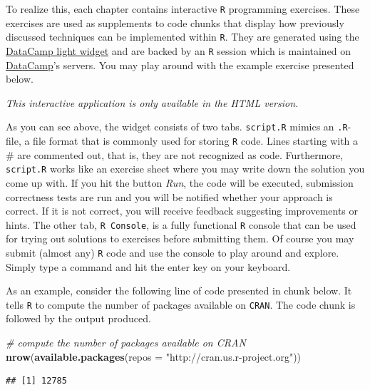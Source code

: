 \documentclass[]{book}
\newenvironment{Shaded}{\begin{snugshade}}{\end{snugshade}}
\newcommand{\KeywordTok}[1]{\textcolor[rgb]{0.13,0.29,0.53}{\textbf{#1}}}
\newcommand{\DataTypeTok}[1]{\textcolor[rgb]{0.13,0.29,0.53}{#1}}
\newcommand{\StringTok}[1]{\textcolor[rgb]{0.31,0.60,0.02}{#1}}
\newcommand{\CommentTok}[1]{\textcolor[rgb]{0.56,0.35,0.01}{\textit{#1}}}
\newcommand{\NormalTok}[1]{#1}
\theoremstyle{definition}
\theoremstyle{definition}
\theoremstyle{definition}
\theoremstyle{remark}
\begin{document}
To realize this, each chapter contains interactive \texttt{R}
programming exercises. These exercises are used as supplements to code
chunks that display how previously discussed techniques can be
implemented within \texttt{R}. They are generated using the
\href{https://github.com/datacamp/datacamp-light}{DataCamp light widget}
and are backed by an \texttt{R} session which is maintained on
\href{https://www.datacamp.com/home}{DataCamp}'s servers. You may play
around with the example exercise presented below.

\begin{center}\textit{This interactive application is only available in the HTML version.}\end{center}

As you can see above, the widget consists of two tabs. \texttt{script.R}
mimics an \texttt{.R}-file, a file format that is commonly used for
storing \texttt{R} code. Lines starting with a \# are commented out,
that is, they are not recognized as code. Furthermore, \texttt{script.R}
works like an exercise sheet where you may write down the solution you
come up with. If you hit the button \emph{Run}, the code will be
executed, submission correctness tests are run and you will be notified
whether your approach is correct. If it is not correct, you will receive
feedback suggesting improvements or hints. The other tab,
\texttt{R Console}, is a fully functional \texttt{R} console that can be
used for trying out solutions to exercises before submitting them. Of
course you may submit (almost any) \texttt{R} code and use the console
to play around and explore. Simply type a command and hit the enter key
on your keyboard.

As an example, consider the following line of code presented in chunk
below. It tells \texttt{R} to compute the number of packages available
on \texttt{CRAN}. The code chunk is followed by the output produced.

\begin{Shaded}
\begin{Highlighting}[]
\CommentTok{# compute the number of packages available on CRAN}
\KeywordTok{nrow}\NormalTok{(}\KeywordTok{available.packages}\NormalTok{(}\DataTypeTok{repos =} \StringTok{"http://cran.us.r-project.org"}\NormalTok{))}
\end{Highlighting}
\end{Shaded}

\begin{verbatim}
## [1] 12785
\end{verbatim}
\end{document}
